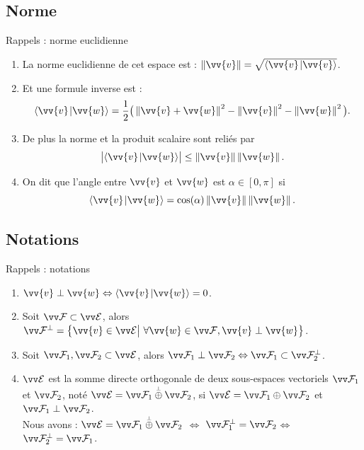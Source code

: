 \documentclass{m53beamer}
\begin{document}
\subsection{Norme}
\begin{frame}{Rappels : norme euclidienne}
  \begin{enumerate}[<+(1)->]
    \item La \alert{norme euclidienne} de cet espace est : $\norm{\vv{v}} = \sqrt{\scalprod{\vv{v}}{\vv{v}}}$.
    \item Et une formule inverse  est :
      \[
        \scalprod{\vv{v}}{\vv{w}} = \frac12\big( \norm{\vv{v}+\vv{w}}^{2} - \norm{\vv{v}}^{2} - \norm{\vv{w}}^{2}\big).
      \]
    \item De plus la norme et la produit scalaire sont reliés par 
      \[
        \big|\scalprod{\vv{v}}{\vv{w}}\big| \leq \norm{\vv{v}}\norm{\vv{w}}.
      \]
    \item On dit que \alert{l'angle} entre $\vv{v}$ et $\vv{w}$ est $\alpha \in[0,\pi]$ si
      \[
        \scalprod{\vv{v}}{\vv{w}} = \cos(\alpha)\norm{\vv{v}}\norm{\vv{w}}.
      \]
  \end{enumerate}
\end{frame}

\subsection{Notations}
\begin{frame}{Rappels : notations}
  \begin{enumerate}[<+(1)->]
    \item $\vv{v}\perp\vv{w} \Leftrightarrow \scalprod{\vv{v}}{\vv{w}}=0$.
    \item Soit $\ev{F}\subset\ev{E}$, alors $\ev{F}^{\perp}=\big\{\vv{v} \in \ev{E} \big|\ \forall \vv{w} \in \ev{F}, \vv{v}\perp\vv{w} \big\}$.
    \item Soit $\ev{F}_{1},\ev{F}_{2}\subset\ev{E}$, alors $\ev{F}_{1}\perp\ev{F}_{2} \Leftrightarrow \ev{F}_{1}\subset\ev{F}_{2}^{\perp}$.
    \item $\ev{E}$ est la somme directe orthogonale de deux sous-espaces vectoriels $\ev{F}_{1}$ et $\ev{F}_{2}$, noté $\ev{E}=\ev{F}_{1}\poplus\ev{F}_{2}$, \pause si $\ev{E}=\ev{F}_{1}\oplus\ev{F}_{2}$ et $\ev{F}_{1}\perp\ev{F}_{2}$.\pause\\
    Nous avons : $\ev{E}=\ev{F}_{1}\poplus\ev{F}_{2}$ $\Leftrightarrow$ $\ev{F}_{1}^{\perp} = \ev{F}_{2}$\pause $\Leftrightarrow$ $\ev{F}_{2}^{\perp} = \ev{F}_{1}$.
  \end{enumerate}
\end{frame}
\end{document}
